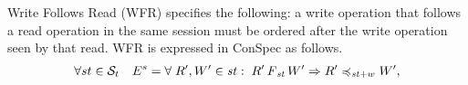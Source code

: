 \documentclass[journal,compsoc]{IEEEtran}
\begin{document}
\par Write Follows Read (WFR) specifies the following: a write operation that follows a read operation in the same session must be ordered after the write operation seen by that read. WFR is expressed in ConSpec as follows. \\
 \begin{align}\label{eqn:WFR}
\begin{split}
\forall st \in \mathcal{S}_t \quad E^{s} =  \forall \; {R}', {W}' \in \mathit{st} : \; {R}' \operatorname{\it F}_\mathit{st} {W}'
 \Rightarrow {R}' \preccurlyeq_{\mathit{st}+w} {W}' , %

\end{split}
\end{align}
\end{document}
